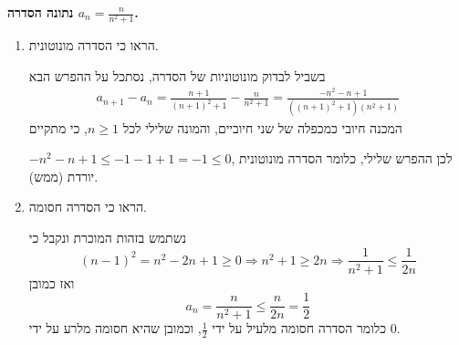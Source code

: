 \textbf{נתונה הסדרה
$a_n=\frac{n}{n^2+1}$.}
\begin{enumerate}
\item
הראו כי הסדרה מונוטונית.
\begin{solbox}
    בשביל לבדוק מונוטוניות של הסדרה, נסתכל על ההפרש הבא
    \begin{align*}
        a_{n+1}-a_n=\frac{n+1}{(n+1)^2+1}-\frac{n}{n^2+1}
        =\frac{-n^2-n+1}{((n+1)^2+1)(n^2+1)}
    \end{align*}
    המכנה חיובי כמכפלה של שני חיוביים, והמונה שלילי לכל
    $n\ge 1$,
    כי
    מתקיים

    $-n^2-n+1\le -1-1+1=-1\le0$,
    לכן
    ההפרש שלילי, כלומר הסדרה מונוטונית יורדת (ממש).
\end{solbox}
\item
הראו כי הסדרה חסומה.
\begin{solbox}
    נשתמש בזהות המוכרת ונקבל כי
    $$(n-1)^2=n^2-2n+1\ge0\Longrightarrow n^2+1\ge 2n\Longrightarrow \frac{1}{n^2+1}\le \frac{1}{2n}$$
    ואז כמובן
    $$a_n=\frac{n}{n^2+1}\le \frac{n}{2n}=\frac12$$
    כלומר הסדרה חסומה מלעיל על ידי
    $\frac12$,
    וכמובן שהיא חסומה מלרע על ידי
    $0$.
\end{solbox}
\end{enumerate}
